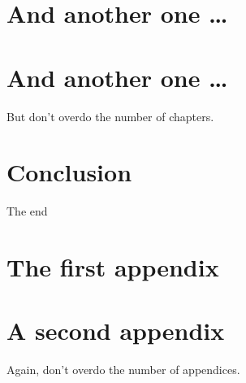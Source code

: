 \documentclass[a4paper,oneside,11pt]{report}
\begin{document}
\chapter{And another one \ldots}

\chapter{And another one \ldots}

But don't overdo the number of chapters.

\chapter{Conclusion}

The end






\appendix


\chapter{The first appendix}

\chapter{A second appendix}

Again, don't overdo the number of appendices.
\end{document}
